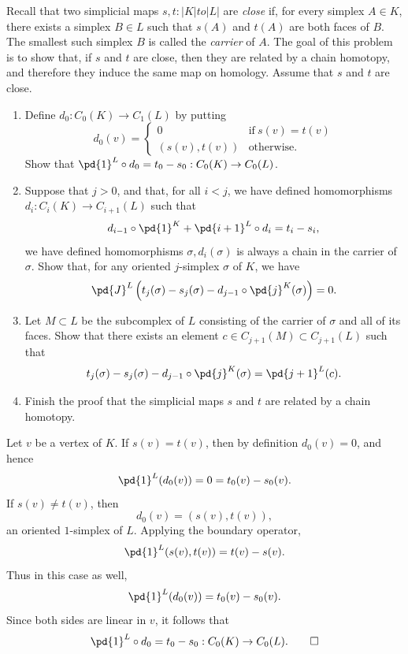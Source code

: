 \begin{problem}[4]
  Recall that two simplicial maps $s, t : |K| to |L|$ are \textit{close} if, for every simplex $A \in K$, there exists a simplex $B \in L$ such that $s(A)$ and $t(A)$ are both faces of $B$. The smallest such simplex $B$ is called the \textit{carrier} of $A$. The goal of this problem is to show that, if $s$ and $t$ are close, then they are related by a chain homotopy, and therefore they induce the same map on homology. Assume that $s$ and $t$ are close.
  \begin{enumerate}
    \item Define $d_0 : C_0(K) \to C_1(L)$ by putting
      \[%
        d_0(v) = \begin{cases}
          0 & \text{if}~s(v) = t(v) \\
          (s(v), t(v)) & \text{otherwise}.
        \end{cases}
      \]%
      Show that $\pd{1}^L \circ d_0 = t_0 - s_0 : C_0(K) \to C_0(L)$.
    \item Suppose that $j > 0$, and that, for all $i < j$, we have defined homomorphisms $d_i : C_i(K) \to C_{i+1}(L)$ such that
      \[%
        d_{i-1} \circ \pd{1}^K + \pd{i+1}^L \circ d_i = t_i - s_i
      ,\]%
      we have defined homomorphisms $\sigma, d_i(\sigma)$ is always a chain in the carrier of $\sigma$. Show that, for any oriented $j$-simplex $\sigma$ of $K$, we have
      \[%
        \pd{J}^L\left(t_j(\sigma) - s_j(\sigma) - d_{j-1} \circ \pd{j}^K(\sigma)\right) = 0
      .\]%
    \item Let $M \subset L$ be the subcomplex of $L$ consisting of the carrier of $\sigma$ and all of its faces. Show that there exists an element $c \in C_{j+1}(M) \subset C_{j+1}(L)$ such that
      \[%
        t_j(\sigma) - s_j(\sigma) - d_{j-1} \circ \pd{j}^K(\sigma) = \pd{j+1}^L(c)
      .\]%
    \item Finish the proof that the simplicial maps $s$ and $t$ are related by a chain homotopy.
  \end{enumerate}
\end{problem}

\begin{solution}[(i)]
  Let $v$ be a vertex of $K$. If $s(v) = t(v)$, then by definition $d_0(v) = 0$, and hence
  \[%
    \pd{1}^L(d_0(v)) = 0 = t_0(v) - s_0(v)
  .\]%
  If $s(v) \ne t(v)$, then
  \[%
    d_0(v) = (s(v), t(v))
  ,\]%
  an oriented $1$-simplex of $L$. Applying the boundary operator,
  \[%
    \pd{1}^L(s(v), t(v)) = t(v) - s(v)
  .\]%
  Thus in this case as well,
  \[%
    \pd{1}^L(d_0(v)) = t_0(v) - s_0(v)
  .\]%
  Since both sides are linear in $v$, it follows that
  \[%
    \pd{1}^L \circ d_0 = t_0 - s_0 : C_0(K) \to C_0(L)
  .\qedhere\]%
\end{solution}

